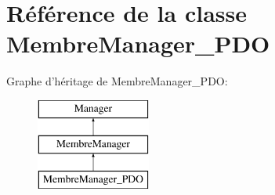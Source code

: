 \hypertarget{class_library_1_1_models_1_1_membre_manager___p_d_o}{\section{Référence de la classe Membre\+Manager\+\_\+\+P\+D\+O}
\label{class_library_1_1_models_1_1_membre_manager___p_d_o}
}
Graphe d'héritage de Membre\+Manager\+\_\+\+P\+D\+O\+:\begin{figure}[H]
\begin{center}
\leavevmode
\includegraphics[height=3.000000cm]{class_library_1_1_models_1_1_membre_manager___p_d_o}
\end{center}
\end{figure}
